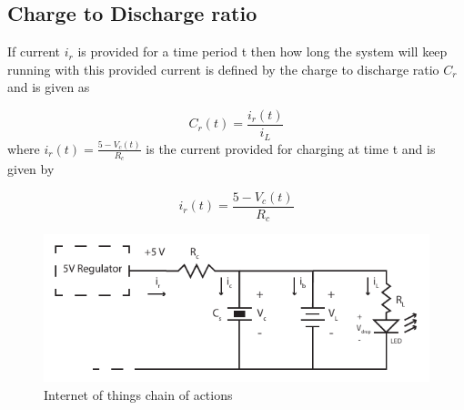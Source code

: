 \subsection{Charge to Discharge ratio}
If current $i_r$ is provided for a time period t then how long the system will keep running with this provided current is defined by the charge to discharge ratio $C_r$ and is given as

\begin{equation}\label{eq:cdr}
 C_r(t) = \frac{i_r(t)}{i_L}
\end{equation}
where $i_r(t) = \frac {5-V_c(t)}{R_c}$ is the current provided for charging at time t and is given by

\begin{equation}\label{eq:ir}
 i_r(t) = \frac {5-V_c(t)}{R_c}
\end{equation}





\begin{figure}[h!]
\centering
\includegraphics[width=1\textwidth]{rec_design.pdf}
\caption{Internet of things chain of actions}
\label{fig:cr}
\end{figure}

